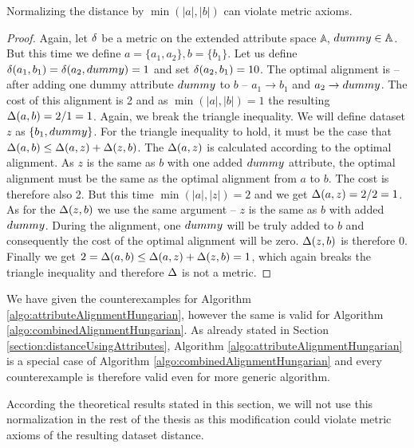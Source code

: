 \begin{observation}
	Normalizing the distance by $\min(|a|,|b|)$ can violate metric axioms.
	\begin{proof}
		 Again, let $\delta$ be a metric on the extended attribute space $\mathbb{A}$, $dummy \in \mathbb{A}$. But this time we define $a=\lbrace a_1, a_2 \rbrace, b= \lbrace b_1 \rbrace$. Let us define $\delta(a_1,b_1)=\delta(a_2,dummy)=1$ and set $\delta(a_2,b_1)=10$. The optimal alignment is -- after adding one dummy attribute $dummy$ to $b$ -- $a_1 \rightarrow b_1$ and $a_2 \rightarrow dummy$. The cost of this alignment is 2 and as $\min(|a|,|b|)=1$ the resulting $\Delta(a,b)=2/1=1$. Again, we break the triangle inequality. We will define dataset $z$ as $\lbrace b_1,dummy \rbrace$. For the triangle inequality to hold, it must be the case that $\Delta(a,b) \le \Delta(a,z)+\Delta(z,b)$. The $\Delta(a,z)$ is calculated according to the optimal alignment. As $z$ is the same as $b$ with one added $dummy$ attribute, the optimal alignment must be the same as the optimal alignment from $a$ to $b$. The cost is therefore also 2. But this time $\min(|a|,|z|)=2$ and we get $\Delta(a,z)=2/2=1$. As for the $\Delta(z,b)$ we use the same argument -- $z$ is the same as $b$ with added $dummy$. During the alignment, one $dummy$ will be truly added to $b$ and consequently the cost of the optimal alignment will be zero. $\Delta(z,b)$ is therefore 0. Finally we get $2=\Delta(a,b) \le \Delta(a,z)+\Delta(z,b)=1$, which again breaks the triangle inequality and therefore $\Delta$ is not a metric.
	\end{proof}
\end{observation}

We have given the counterexamples for Algorithm \ref{algo:attributeAlignmentHungarian}, however the same is valid for Algorithm \ref{algo:combinedAlignmentHungarian}. As already stated in Section \ref{section:distanceUsingAttributes}, Algorithm \ref{algo:attributeAlignmentHungarian} is a special case of Algorithm  \ref{algo:combinedAlignmentHungarian} and every counterexample is therefore valid even for more generic algorithm.

According the theoretical results stated in this section, we will not use this normalization in the rest of the thesis as this modification could violate metric axioms of the resulting dataset distance.